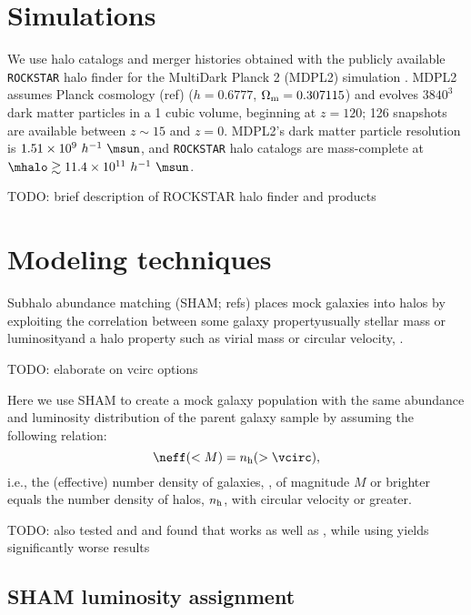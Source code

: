 \documentclass[twocolumn,apj,iop,tighten]{emulateapj2}
\begin{document}
\section{Simulations}\label{sec:sims}

We use halo catalogs and merger histories obtained with the publicly available \texttt{ROCKSTAR} halo finder \citep{behroozi_etal13b} for the MultiDark Planck 2 (MDPL2) simulation \citep{klypin_etal16}. MDPL2 assumes Planck cosmology (ref) ($h=0.6777$, $\Omega_{\rm m}=0.307115$) and evolves $3840^3$ dark matter particles in a 1 \Gpch cubic volume, beginning at $z=120$; 126 snapshots are available between $z\sim15$ and $z=0$. MDPL2's dark matter particle resolution is $1.51\times10^9\ h^{-1}\ \msun$, and \texttt{ROCKSTAR} halo catalogs are mass-complete at $\mhalo\gtrsim11.4\times10^{11}\ h^{-1}\ \msun$.

TODO: brief description of ROCKSTAR halo finder and products

\section{Modeling techniques}\label{sec:model}

Subhalo abundance matching (SHAM; refs) places mock galaxies into halos by exploiting the correlation between some galaxy property\textemdash usually stellar mass or luminosity\textemdash and a halo property such as virial mass or circular velocity, \vcirc.

TODO: elaborate on vcirc options

Here we use SHAM to create a mock galaxy population with the same abundance and luminosity distribution of the parent galaxy sample by assuming the following relation:
%
\begin{equation}\label{eq:sham}
\neff(<M)=n_{\rm h}(>\vcirc),
\end{equation}
%
\noindent i.e., the (effective) number density of galaxies, \neff, of magnitude $M$ or brighter equals the number density of halos, $n_{\rm h}$, with circular velocity \vcirc or greater.

TODO: also tested \vmax and \vmaxmpeak and found that \vmaxmpeak works as well as \vpeak, while using \vmax yields significantly worse results


\subsection{SHAM luminosity assignment}\label{subsec:luminosity_assign}
\end{document}
